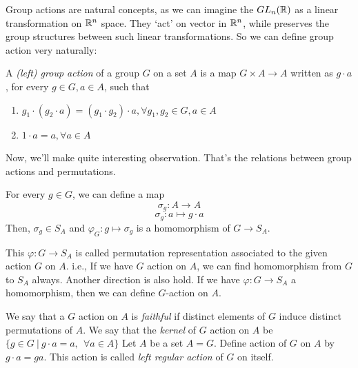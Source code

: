 \documentclass[12pt, a4paper, openany, twoside]{book}
\theoremstyle{definition}
\theoremstyle{remark}
\theoremstyle{plain}
\numberwithin{equation}{section}
\begin{document}
Group actions are natural concepts, as we can imagine the $GL_n({\mathbb {R}})$ as a linear transformation on ${\mathbb {R}}^n$ space. 
They \lq act' on vector in ${\mathbb {R}}^n$, while preserves the group structures between such linear transformations. So we can define group action very naturally:

\begin{tcolorbox}[colback=yellow!10!white,colframe=brown!75!black,title=Group Action]

A \textit{(left) group action} of a group $G$ on a set $A$ is a map $G \times A \rightarrow A$ written as $g \cdot a$, for every $g \in G, a \in A$, such that 
\begin{enumerate}
    \item $g_1 \cdot (g_2 \cdot a) = (g_1 \cdot g_2) \cdot a, \forall g_1, g_2 \in G, a \in A$
    \item $1 \cdot a = a, \forall a \in A$
\end{enumerate}

\end{tcolorbox}

Now, we'll make quite interesting observation. That's the relations between group actions and permutations. 

\begin{tcolorbox}[colback=yellow!10!white,colframe=green!75!black,title=Group Action as Permutation]

For every $g \in G$, we can define a map 
\[\sigma_g : A \rightarrow A\]
\[\sigma_g : a \mapsto g \cdot a\]
Then, $\sigma_g \in S_A$ and $\varphi_G : g \mapsto \sigma_g$ is a homomorphism of $G \rightarrow S_A$.

\end{tcolorbox}

This $\varphi: G \rightarrow S_A$ is called permutation representation associated to the given action $G$ on $A$.
i.e., If we have $G$ action on $A$, we can find homomorphism from $G$ to $S_A$ always. 
Another direction is also hold. If we have $\varphi : G \rightarrow S_A$ a homomorphism, then 
we can define $G$-action on $A$. 

\begin{tcolorbox}[colback=yellow!10!white,colframe=green!75!black,title=faithful\, kernel\, left regular action]

We say that a $G$ action on $A$ is \textit{faithful} if distinct elements of $G$ induce distinct permutations of $A$. 
We say that the \textit{kernel} of $G$ action on $A$ be $\{g \in G ~|~ g \cdot a = a, ~~ \forall a \in A\}$
Let $A$ be a set $A = G$. Define action of $G$ on $A$ by $g \cdot a = ga$. This action is called \textit{left regular action} of $G$ on itself.

\end{tcolorbox}
\end{document}
